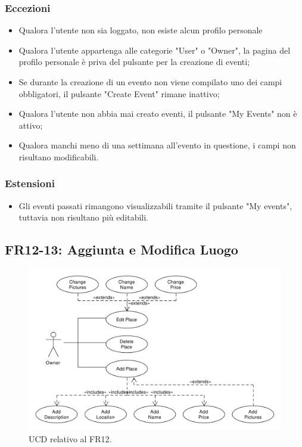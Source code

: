 \documentclass[9pt]{extarticle}
\begin{document}
\subsubsection*{Eccezioni}\label{Eccezioni-FR8-10}

\begin{itemize}
	\item Qualora l'utente non sia loggato, non esiste alcun profilo personale
	\item Qualora l'utente appartenga alle categorie "User" o "Owner", la pagina del profilo personale è priva del pulsante per la creazione di eventi;
	\item Se durante la creazione di un evento non viene compilato uno dei campi obbligatori, il pulsante "Create Event" rimane inattivo;
	\item Qualora l'utente non abbia mai creato eventi, il pulsante "My Events" non è attivo;
	\item Qualora manchi meno di una settimana all'evento in questione, i campi non risultano modificabili.
\end{itemize}

\subsubsection*{Estensioni}\label{Estensioni-FR8-10}

\begin{itemize}
	\item Gli eventi passati rimangono visualizzabili tramite il pulsante "My events", tuttavia non risultano più editabili.
\end{itemize}


\subsection{FR12-13: Aggiunta e Modifica Luogo}


\begin{figure}[!htb]
	\centering
	\includegraphics[width=\linewidth]{./images/FR12.pdf}
	\caption{UCD relativo al FR12.}
	\label{fig:UCD_FR12}
\end{figure}
\end{document}

